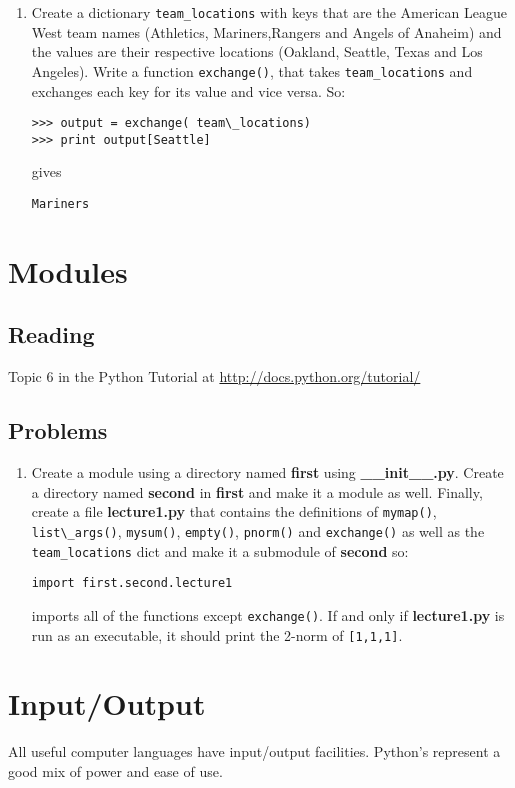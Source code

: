 \begin{enumerate}
	\item Create a dictionary \verb|team_locations| with keys that are the American League West team names (Athletics, Mariners,Rangers and Angels of Anaheim) and the values are their respective locations (Oakland, Seattle, Texas and Los Angeles). Write a function \verb|exchange()|, that takes \verb|team_locations| and exchanges each key for its value and vice versa. So:

\begin{verbatim}
>>> output = exchange( team\_locations)
>>> print output[Seattle]
\end{verbatim}
gives

\verb|Mariners|
\end{enumerate}	

\section{Modules}
\subsection{Reading}
Topic 6 in the Python Tutorial at \url{http://docs.python.org/tutorial/} \cite{website:Python272docs}

\subsection{Problems}
\begin{enumerate}	

	\item Create a module using a directory named \textbf{first} using \textbf{\_\_init\_\_.py}. Create a directory named \textbf{second} in \textbf{first} and make it a module as well. Finally, create a file \textbf{lecture1.py} that contains the definitions of \verb|mymap()|, \verb|list\_args()|, \verb|mysum()|, \verb|empty()|, \verb|pnorm()| and \verb|exchange()| as well as the \verb|team_locations| dict and make it a submodule of \textbf{second} so:

\verb|import first.second.lecture1|

imports all of the functions except \verb|exchange()|. If and only if \textbf{lecture1.py} is run as an executable, it should print the 2-norm of \verb|[1,1,1]|.

\end{enumerate}

\section{Input/Output}
All useful computer languages have input/output facilities. Python's represent a good mix of power and ease of use.

